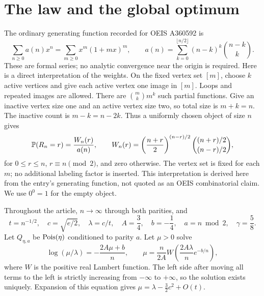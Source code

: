 \section{The law and the global optimum}\label{spb:ml:sec:results}
The ordinary generating function recorded for OEIS A360592 is
\begin{equation}\label{spb:ml:eq:ogf}
\sum_{n\ge0}a(n)x^n=\sum_{m\ge0}x^m(1+mx)^m,
\qquad a(n)=\sum_{k=0}^{\lfloor n/2\rfloor}(n-k)^k\binom{n-k}{k}.
\end{equation}
These are formal series; no analytic convergence near the origin is required. Here is a direct interpretation of the weights. On the fixed vertex set $[m]$, choose $k$ active vertices and give each active vertex one image in $[m]$. Loops and repeated images are allowed. There are $\binom mk m^k$ such partial functions. Give an inactive vertex size one and an active vertex size two, so total size is $m+k=n$. The inactive count is $m-k=n-2k$. Thus a uniformly chosen object of size $n$ gives
\begin{equation}\label{spb:ml:eq:law}
\mathbb P(R_n=r)=\frac{W_n(r)}{a(n)},\qquad
W_n(r)=\left(\frac{n+r}{2}\right)^{(n-r)/2}
\binom{(n+r)/2}{(n-r)/2},
\end{equation}
for $0\le r\le n$, $r\equiv n\pmod2$, and zero otherwise. The vertex set is fixed for each $m$; no additional labeling factor is inserted. This interpretation is derived here from the entry's generating function, not quoted as an OEIS combinatorial claim. We use $0^0=1$ for the empty object.

Throughout the article, $n\to\infty$ through both parities, and
\begin{equation}\label{spb:ml:eq:notation}
 t=n^{-1/2},\quad c=\sqrt{e/2},\quad \lambda=c/t,\quad
 A=\frac34,\quad b=-\frac14,\quad a=n\bmod2,\quad \gamma=\frac58.
\end{equation}
Let $Q_{\eta,a}$ be $\operatorname{Pois}(\eta)$ conditioned to parity $a$. Let $\mu>0$ solve
\begin{equation}\label{spb:ml:eq:mu}
\log(\mu/\lambda)=-\frac{2A\mu+b}{n},\qquad
\mu=\frac{n}{2A}W\left(\frac{2A\lambda}{n}e^{-b/n}\right),
\end{equation}
where $W$ is the positive real Lambert function. The left side after moving all terms to the left is strictly increasing from $-\infty$ to $+\infty$, so the solution exists uniquely. Expansion of this equation gives $\mu=\lambda-\frac32c^2+O(t)$.


